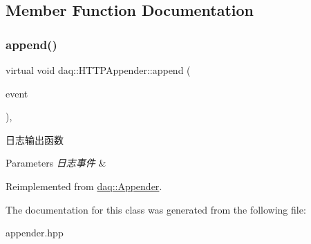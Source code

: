 \subsection{Member Function Documentation}
\mbox{\label{classdaq_1_1HTTPAppender_a0d4525deaa491bbc44a7b463bc931967}} 
\subsubsection{\texorpdfstring{append()}{append()}}
{\footnotesize\ttfamily virtual void daq\+::\+H\+T\+T\+P\+Appender\+::append (\begin{DoxyParamCaption}\item[{Log\+Event\+::sptr}]{event }\end{DoxyParamCaption})\hspace{0.3cm}{\ttfamily [override]}, {\ttfamily [virtual]}}



日志输出函数 


\begin{DoxyParams}{Parameters}
{\em 日志事件} & \\
\hline
\end{DoxyParams}


Reimplemented from \hyperlink{classdaq_1_1Appender_a66e8f896daf7ad4a82769949b351b994}{daq\+::\+Appender}.



The documentation for this class was generated from the following file\+:\begin{DoxyCompactItemize}
\item 
appender.\+hpp\end{DoxyCompactItemize}
